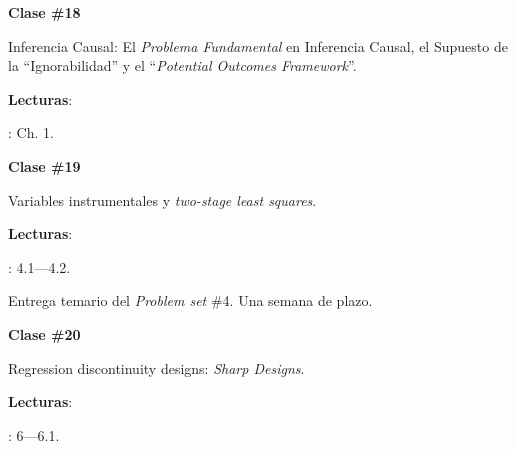 \documentclass[letterpaper]{article}
\renewenvironment{itemize}{
  \begin{list}{}{
    \setlength{\leftmargin}{1.5em}
  }
}{
  \end{list}
}
\begin{document}
\begin{enumerate}
  \item {}


      \begin{itemize} 
        \item[$\bullet$] {\bf Clase \#18}
          \begin{itemize} 
            \item[$\circ$] Inferencia Causal: El \emph{Problema Fundamental} en Inferencia Causal, el Supuesto de la ``Ignorabilidad'' y el ``\emph{Potential Outcomes Framework}''.
            \item[$\circ$] {\bf Lecturas}: 
              \begin{itemize}
                \item[$\diamond$] \textcite{Imbens2015}: Ch. 1.
              \end{itemize}
          \end{itemize}
      \end{itemize}





      \begin{itemize} 
        \item[$\bullet$] {\bf Clase \#19}
          \begin{itemize} 
            \item[$\circ$] Variables instrumentales y \emph{two-stage least squares}.
            \item[$\circ$] {\bf Lecturas}: 
              \begin{itemize}
                \item[$\diamond$] \textcite{Angrist2009}: 4.1---4.2.
              \end{itemize}
          \end{itemize}
      \end{itemize}


\item[{\color{red}\Pointinghand}] Entrega temario del \emph{Problem set} \#4. Una semana de plazo.


      \begin{itemize} 
        \item[$\bullet$] {\bf Clase \#20}
          \begin{itemize} 
            \item[$\circ$] Regression discontinuity designs: \emph{Sharp Designs}.
            \item[$\circ$] {\bf Lecturas}: 
              \begin{itemize}
                \item[$\diamond$] \textcite{Angrist2009}: 6---6.1.
              \end{itemize}
          \end{itemize}
      \end{itemize}



\end{enumerate}
\end{document}
